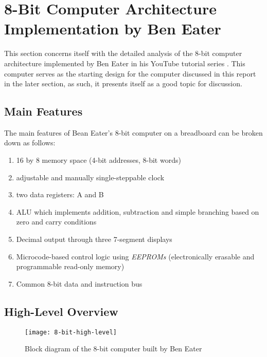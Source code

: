 \section{8-Bit Computer Architecture Implementation by Ben Eater \cite{eater2019breadboard}}
This section concerns itself with the detailed analysis of the 8-bit computer architecture implemented by Ben Eater in his YouTube tutorial series \cite{eater2019breadboard}. This computer serves as the starting design for the computer discussed in this report in the later section, as such, it presents itself as a good topic for discussion.

\subsection{Main Features}
The main features of Bean Eater's 8-bit computer on a breadboard can be broken down as follows:
\begin{enumerate}
  \item 16 by 8 memory space (4-bit addresses, 8-bit words)
  \item adjustable and manually single-steppable clock
  \item two data registers: A and B
  \item ALU which implements addition, subtraction and simple branching based on zero and carry conditions
  \item Decimal output through three 7-segment displays
  \item Microcode-based control logic using \emph{EEPROMs} (electronically erasable and programmable read-only memory)
  \item Common 8-bit data and instruction bus
\end{enumerate}

\subsection{High-Level Overview}
\begin{figure}[ht]
  \centering
  \texttt{[image: 8-bit-high-level]}
  \caption{Block diagram of the 8-bit computer built by Ben Eater \cite{eater2019highlevel}}
  \label{8-bit-high-level}
\end{figure}



